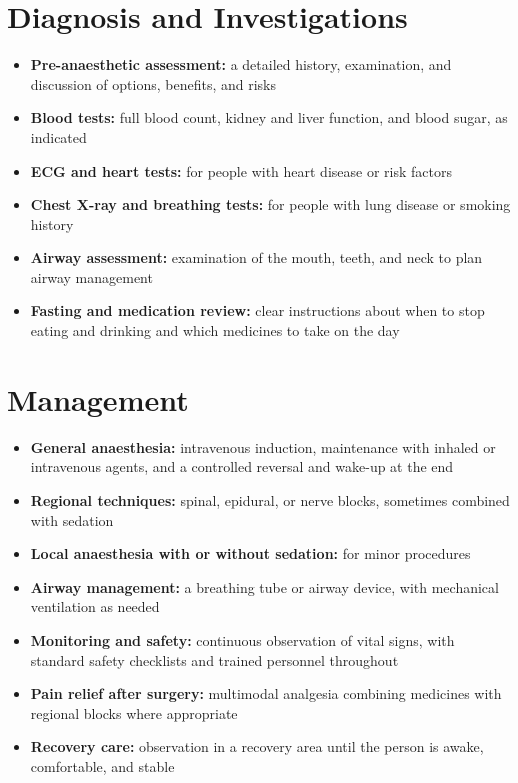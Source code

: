 \section*{Diagnosis and Investigations}
\begin{itemize}
    \item \textbf{Pre-anaesthetic assessment:} a detailed history, examination, and discussion of options, benefits, and risks
    \item \textbf{Blood tests:} full blood count, kidney and liver function, and blood sugar, as indicated
    \item \textbf{ECG and heart tests:} for people with heart disease or risk factors
    \item \textbf{Chest X-ray and breathing tests:} for people with lung disease or smoking history
    \item \textbf{Airway assessment:} examination of the mouth, teeth, and neck to plan airway management
    \item \textbf{Fasting and medication review:} clear instructions about when to stop eating and drinking and which medicines to take on the day
\end{itemize}

\section*{Management}
\begin{itemize}
    \item \textbf{General anaesthesia:} intravenous induction, maintenance with inhaled or intravenous agents, and a controlled reversal and wake-up at the end
    \item \textbf{Regional techniques:} spinal, epidural, or nerve blocks, sometimes combined with sedation
    \item \textbf{Local anaesthesia with or without sedation:} for minor procedures
    \item \textbf{Airway management:} a breathing tube or airway device, with mechanical ventilation as needed
    \item \textbf{Monitoring and safety:} continuous observation of vital signs, with standard safety checklists and trained personnel throughout
    \item \textbf{Pain relief after surgery:} multimodal analgesia combining medicines with regional blocks where appropriate
    \item \textbf{Recovery care:} observation in a recovery area until the person is awake, comfortable, and stable
\end{itemize}

